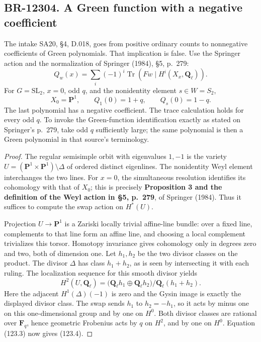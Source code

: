 \subsection{BR-12304. A Green function with a negative coefficient}
The intake SA20, \S4, D.018, goes from positive ordinary
counts to nonnegative coefficients of Green polynomials.
That implication is false. Use the Springer action and the
normalization of Springer (1984), \S5, p.~279:
\[
 Q_w(x)=\sum_i(-1)^i\operatorname{Tr}
       (Fw\mid H^i(X_x,\mathbf Q_\ell)).
 \tag{123.3}
\]
For \(G=\mathrm{SL}_2\), \(x=0\), odd \(q\), and the
nonidentity element \(s\in W=S_2\),
\[
 X_0=\mathbf P^1,\qquad Q_1(0)=1+q,
       \qquad Q_s(0)=1-q.
 \tag{123.4}
\]
The last polynomial has a negative coefficient. The
trace calculation holds for every odd \(q\). To invoke
the Green-function identification exactly as stated on
Springer's p.~279, take odd \(q\) sufficiently large;
the same polynomial is then a Green polynomial in that
source's terminology.

\begin{proof}
The regular semisimple orbit with eigenvalues \(1,-1\)
is the variety
\(U=(\mathbf P^1\times\mathbf P^1)\setminus\Delta\)
of ordered distinct eigenlines. The nonidentity Weyl element
interchanges the two lines. For \(x=0\), the simultaneous
resolution identifies its cohomology with that of \(X_0\);
this is precisely \textbf{Proposition 3 and the definition
of the Weyl action in \S5, p.~279}, of Springer (1984).
Thus it suffices to compute the swap action on \(H^*(U)\).

Projection \(U\to\mathbf P^1\) is a Zariski locally trivial
affine-line bundle: over a fixed line, complements to that
line form an affine line, and choosing a local complement
trivializes this torsor. Homotopy invariance gives cohomology
only in degrees zero and two, both of dimension one.
Let \(h_1,h_2\) be the two divisor classes on the product.
The divisor \(\Delta\) has class \(h_1+h_2\), as is seen
by intersecting it with each ruling. The localization
sequence for this smooth divisor yields
\[
 H^2(U,\mathbf Q_\ell)
   =\bigl(\mathbf Q_\ell h_1\oplus\mathbf Q_\ell h_2\bigr)
       /\mathbf Q_\ell(h_1+h_2).
\]
Here the adjacent \(H^1(\Delta)(-1)\) is zero and the
Gysin image is exactly the displayed divisor class.
The swap sends \(h_1\) to \(h_2=-h_1\), so it acts
by minus one on this one-dimensional group and by one
on \(H^0\). Both divisor classes are rational over
\(\mathbf F_q\), hence geometric Frobenius acts by
\(q\) on \(H^2\), and by one on \(H^0\).
Equation (123.3) now gives (123.4).
\end{proof}

